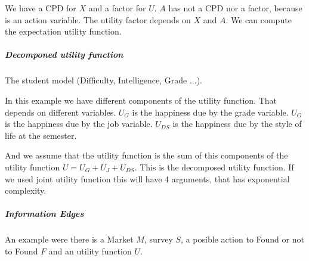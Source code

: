 We have a CPD for $X$ and a factor for $U$.
$A$ has not a CPD nor a factor, because is an action variable.
The utility factor depends on $X$ and $A$.
We can compute the expectation utility function.

\subparagraph{Decomponed utility function}

The student model (Difficulty, Intelligence, Grade ...). 

\begin{center}
\end{center}

In this example we have different components of the utility function.
That depends on different variables.
$U_G$ is the happiness due by the grade variable.
$U_G$ is the happiness due by the job variable.
$U_{DS}$ is the happiness due by the style of life at the semester.

\vspace{0.3cm}

And we assume that the utility function is the sum of this components of the utility function $ U = U_G + U_J + U_{DS}$.
This is the decomposed utility function.
If we used joint utility function this will have 4 arguments, that has exponential complexity.

\subparagraph{Information Edges}

An example were there is a Market $M$, survey $S$, a posible action to Found or not to Found $F$ and an utility function $U$.


